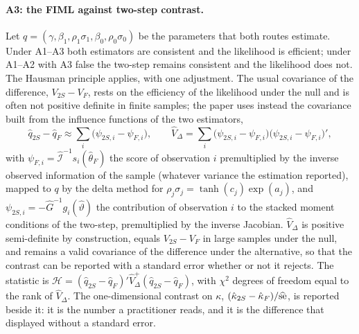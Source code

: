 \documentclass[11pt,a4paper]{article}
\theoremstyle{plain}
\theoremstyle{definition}
\theoremstyle{remark}
\newcommand{\1}{\mathbf{1}}
\begin{document}
\paragraph{A3: the FIML against two-step contrast.}
Let $q=(\gamma,\beta_1,\rho_1\sigma_1,\beta_0,\rho_0\sigma_0)$ be the
parameters that both routes estimate. Under A1--A3 both estimators are
consistent and the likelihood is efficient; under A1--A2 with A3 false the
two-step remains consistent and the likelihood does not. The Hausman
principle applies, with one adjustment. The usual covariance of the
difference, $V_{2S}-V_F$, rests on the efficiency of the likelihood under
the null and is often not positive definite in finite samples; the paper
uses instead the covariance built from the influence functions of the two
estimators,
\begin{equation}\label{eq:hausman}
\hat q_{2S}-\hat q_F\approx\sum_i\bigl(\psi_{2S,i}-\psi_{F,i}\bigr),\qquad
\hat V_\Delta=\sum_i\bigl(\psi_{2S,i}-\psi_{F,i}\bigr)\bigl(\psi_{2S,i}-\psi_{F,i}\bigr)',
\end{equation}
with $\psi_{F,i}=\hat{\mathcal I}^{-1}s_i(\hat\theta_F)$ the score of
observation $i$ premultiplied by the inverse observed information of the
sample (whatever variance the estimation reported), mapped to $q$
by the delta method for $\rho_j\sigma_j=\tanh(c_j)\exp(a_j)$, and
$\psi_{2S,i}=-\hat G^{-1}g_i(\hat\vartheta)$ the contribution of
observation $i$ to the stacked moment conditions of the two-step,
premultiplied by the inverse Jacobian. $\hat V_\Delta$ is positive
semi-definite by construction, equals $V_{2S}-V_F$ in large samples under
the null, and remains a valid covariance of the difference under the
alternative, so that the contrast can be reported with a standard error
whether or not it rejects. The statistic is
$\mathcal{H}=(\hat q_{2S}-\hat q_F)'\hat V_\Delta^{+}(\hat q_{2S}-\hat q_F)$,
with $\chi^2$ degrees of freedom equal to the rank of $\hat V_\Delta$. The
one-dimensional contrast on $\kappa$,
$(\hat\kappa_{2S}-\hat\kappa_F)/\widehat{\rm se}$, is reported beside it:
it is the number a practitioner reads, and it is the difference that
\citet{araar2026msat} displayed without a standard error.
\end{document}

